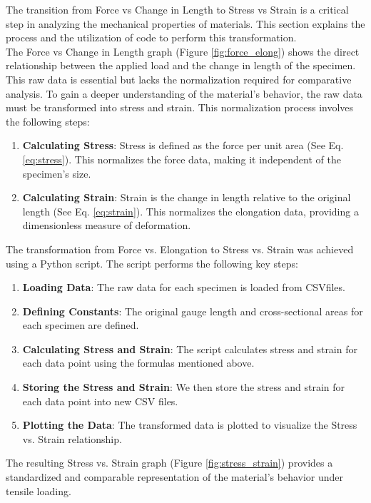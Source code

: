 \documentclass{article}
\begin{document}
{ The transition from Force vs Change in Length to Stress vs Strain is a critical step in analyzing the mechanical properties of materials. This section explains the process and the utilization of code to perform this transformation.\\[8pt]
 The Force vs Change in Length graph (Figure \ref{fig:force_elong}) shows the direct relationship between the applied load and the change in length of the specimen. This raw data is essential but lacks the normalization required for comparative analysis. To gain a deeper understanding of the material's behavior, the raw data must be transformed into stress and strain. This normalization process involves the following steps:
 \begin{enumerate}
     \item \textbf{Calculating Stress}: Stress is defined as the force per unit area (See Eq. \ref{eq:stress}). This normalizes the force data, making it independent of the specimen's size.
     \item \textbf{Calculating Strain}: Strain is the change in length relative to the original length (See Eq. \ref{eq:strain}). This normalizes the elongation data, providing a dimensionless measure of deformation.
 \end{enumerate}
 The transformation from Force vs. Elongation to Stress vs. Strain was achieved using a Python script. The script performs the following key steps:
 \begin{enumerate}
     \item \textbf{Loading Data}: The raw data for each specimen is loaded from CSV\footnotemark files.
     \item \textbf{Defining Constants}: The original gauge length and cross-sectional areas for each specimen are defined.
     \item \textbf{Calculating Stress and Strain}: The script calculates stress and strain for each data point using the formulas mentioned above.
     \item \textbf{Storing the Stress and Strain}: We then store the stress and strain for each data point into new CSV files.
     \item \textbf{Plotting the Data}: The transformed data is plotted to visualize the Stress vs. Strain relationship.
 \end{enumerate}
 The resulting Stress vs. Strain graph (Figure \ref{fig:stress_strain}) provides a standardized and comparable representation of the material's behavior under tensile loading.\\\noindent{}    \newpage
}
\end{document}
